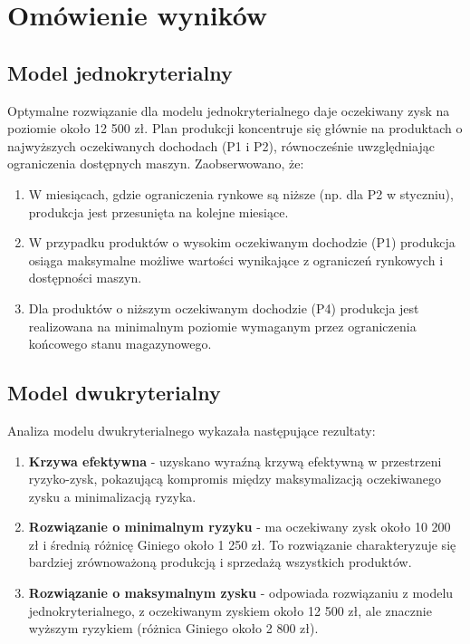 \section{Omówienie wyników}

\subsection{Model jednokryterialny}

Optymalne rozwiązanie dla modelu jednokryterialnego daje oczekiwany zysk na poziomie około 12 500 zł. Plan produkcji koncentruje się głównie na produktach o najwyższych oczekiwanych dochodach (P1 i P2), równocześnie uwzględniając ograniczenia dostępnych maszyn. Zaobserwowano, że:

\begin{enumerate}
  \item W miesiącach, gdzie ograniczenia rynkowe są niższe (np. dla P2 w styczniu), produkcja jest przesunięta na kolejne miesiące.
  \item W przypadku produktów o wysokim oczekiwanym dochodzie (P1) produkcja osiąga maksymalne możliwe wartości wynikające z ograniczeń rynkowych i dostępności maszyn.
  \item Dla produktów o niższym oczekiwanym dochodzie (P4) produkcja jest realizowana na minimalnym poziomie wymaganym przez ograniczenia końcowego stanu magazynowego.
\end{enumerate}

\subsection{Model dwukryterialny}

Analiza modelu dwukryterialnego wykazała następujące rezultaty:

\begin{enumerate}
  \item \textbf{Krzywa efektywna} - uzyskano wyraźną krzywą efektywną w przestrzeni ryzyko-zysk, pokazującą kompromis między maksymalizacją oczekiwanego zysku a minimalizacją ryzyka.
  \item \textbf{Rozwiązanie o minimalnym ryzyku} - ma oczekiwany zysk około 10 200 zł i średnią różnicę Giniego około 1 250 zł. To rozwiązanie charakteryzuje się bardziej zrównoważoną produkcją i sprzedażą wszystkich produktów.
  \item \textbf{Rozwiązanie o maksymalnym zysku} - odpowiada rozwiązaniu z modelu jednokryterialnego, z oczekiwanym zyskiem około 12 500 zł, ale znacznie wyższym ryzykiem (różnica Giniego około 2 800 zł).
\end{enumerate}

